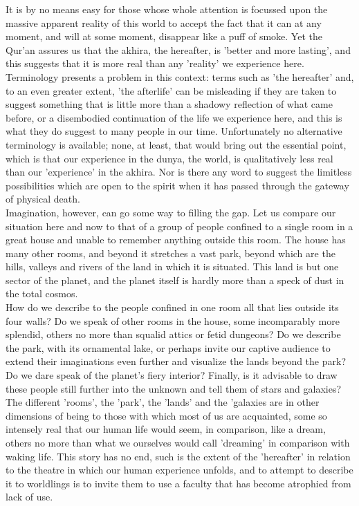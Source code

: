\documentclass[10pt, twoside,openright]{book}
\begin{document}
It is by no means easy for those whose whole attention is focussed upon the massive apparent reality 
of this world to accept the fact that it can at any moment, and will at some moment, disappear like a 
puff of smoke. Yet the Qur'an assures us that the akhira, the hereafter, is 'better and more 
lasting', and this suggests that it is more real than any 'reality' we experience here. Terminology 
presents a problem in this context: terms such as 'the hereafter' and, to an even greater extent, 
'the afterlife' can be misleading if they are taken to suggest something that is little more than a 
shadowy reflection of what came before, or a disembodied continuation of the life we experience here, 
and this is what they do suggest to many people in our time. Unfortunately no alternative terminology 
is available; none, at least, that would bring out the essential point, which is that our experience 
in the dunya, the world, is qualitatively less real than our 'experience' in the akhira. Nor is there 
any word to suggest the limitless possibilities which are open to the spirit when it has passed 
through the gateway of physical death. \\

Imagination, however, can go some way to filling the gap. Let us compare our situation here and now 
to that of a group of people confined to a single room in a great house and unable to remember 
anything outside this room. The house has many other rooms, and beyond it stretches a vast park, 
beyond which are the hills, valleys and rivers of the land in which it is situated. This land is but 
one sector of the planet, and the planet itself is hardly more than a speck of dust in the total 
cosmos. \\

How do we describe to the people confined in one room all that lies outside its four walls? Do we 
speak of other rooms in the house, some incomparably more splendid, others no more than squalid 
attics or fetid dungeons? Do we describe the park, with its ornamental lake, or perhaps invite our 
captive audience to extend their imaginations even further and visualize the lands beyond the park? 
Do we dare speak of the planet's fiery interior? Finally, is it advisable to draw these people still 
further into the unknown and tell them of stars and galaxies? \\

The different 'rooms', the 'park', the 'lands' and the 'galaxies are in other dimensions of being to 
those with which most of us are acquainted, some so intensely real that our human life would seem, in 
comparison, like a dream, others no more than what we ourselves would call 'dreaming' in comparison 
with waking life. This story has no end, such is the extent of the 'hereafter' in relation to the 
theatre in which our human experience unfolds, and to attempt to describe it to worldlings is to 
invite them to use a faculty that has become atrophied from lack of use. \\
\end{document}
